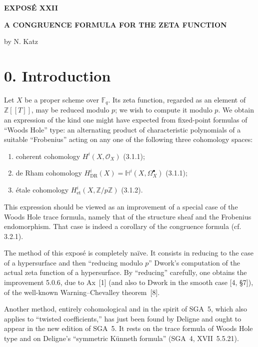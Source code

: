 \clearpage
\begin{center}
{\Large\bfseries EXPOSÉ XXII}\par
\vspace{1.5cm}
{\Large\bfseries A CONGRUENCE FORMULA FOR THE ZETA FUNCTION}\par
\vspace{0.8cm}
{\large by N. Katz}\par
\end{center}

\vspace{1.5cm}
\section*{0. Introduction}

Let $X$ be a proper scheme over $\mathbb F_q$. Its zeta function, regarded as
an element of $\mathbb Z[[T]]$, may be reduced modulo $p$; we wish to compute
it modulo $p$. We obtain an expression of the kind one might have expected
from fixed-point formulas of ``Woods Hole'' type: an alternating product of
characteristic polynomials of a suitable ``Frobenius'' acting on any one of
the following three cohomology spaces:

\begin{enumerate}[label=\arabic*)]
\item coherent cohomology $H^i(X,\mathcal O_X)$ (3.1.1);
\item de Rham cohomology
  $H^i_{\mathrm{DR}}(X)=\mathbb H^i(X,\Omega_X^\bullet)$ (3.1.1);
\item étale cohomology $H^i_{\mathrm{et}}(X,\mathbb Z/p\mathbb Z)$ (3.1.2).
\end{enumerate}

This expression should be viewed as an improvement of a special case of the
Woods Hole trace formula, namely that of the structure sheaf and the
Frobenius endomorphism. That case is indeed a corollary of the congruence
formula (cf. 3.2.1).

The method of this exposé is completely naïve. It consists in reducing to the
case of a hypersurface and then ``reducing modulo $p$'' Dwork's computation
of the actual zeta function of a hypersurface. By ``reducing'' carefully, one
obtains the improvement 5.0.6, due to Ax~[1] (and also to Dwork in the smooth
case [4, \S 7]), of the well-known Warning--Chevalley theorem~[8].

Another method, entirely cohomological and in the spirit of SGA~5, which also
applies to ``twisted coefficients,'' has just been found by Deligne and ought
to appear in the new edition of SGA~5. It rests on the trace formula of Woods
Hole type and on Deligne's ``symmetric Künneth formula''
(SGA~4, XVII~5.5.21).

